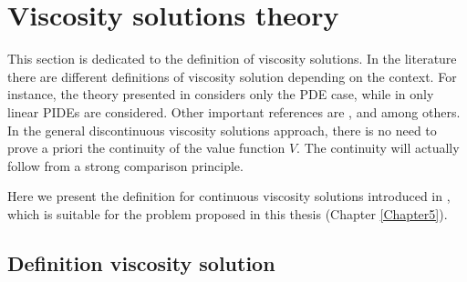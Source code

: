 \section{Viscosity solutions theory}\label{viscosity_solution_section}

This section is dedicated to the definition of viscosity solutions.
In the literature there are different definitions of viscosity solution depending on the context. 
For instance, the theory presented in \cite{Pham} considers only the PDE case, while in \cite{Cont}
only linear PIDEs are considered. 
Other important references are \cite{FlemingSoner}, \cite{Ph98} and \cite{BaIm08} among others.
In the general discontinuous viscosity solutions approach, there is no
need to prove a priori the continuity of the value function $V$. The continuity will actually follow from
a strong comparison principle. 

\noindent
Here we present the definition for continuous viscosity solutions introduced in \cite{Kab16}, which is suitable for the problem proposed in this thesis (Chapter \ref{Chapter5}).





\subsection{Definition viscosity solution}


